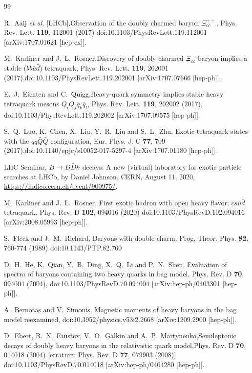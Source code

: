 \documentclass[prt,twocolumn,floatfix,nofootinbib]{revtex4}
\begin{document}
\begin{thebibliography}{99}

    R.~Aaij \textit{et al.} [LHCb],Observation of the doubly charmed baryon $\Xi_{cc}^{++}$, Phys. Rev. Lett. \textbf{119}, 112001 (2017)
    doi:10.1103/PhysRevLett.119.112001 [arXiv:1707.01621 [hep-ex]].

    M.~Karliner and J.~L.~Rosner,Discovery of doubly-charmed $\Xi_{cc}$ baryon implies a stable ($b b \bar{u} \bar{d}$) tetraquark, Phys. Rev. Lett. \textbf{119}, 202001 (2017),doi:10.1103/PhysRevLett.119.202001
    [arXiv:1707.07666 [hep-ph]].

    E.~J.~Eichten and C.~Quigg,Heavy-quark symmetry implies stable heavy tetraquark mesons $Q_iQ_j \bar q_k \bar q_l$, Phys. Rev. Lett. \textbf{119}, 202002 (2017), doi:10.1103/PhysRevLett.119.202002 [arXiv:1707.09575 [hep-ph]].

    S.~Q.~Luo, K.~Chen, X.~Liu, Y.~R.~Liu and S.~L.~Zhu, Exotic tetraquark states with the $qq\bar{Q}\bar{Q}$ configuration, Eur. Phys. J. C \textbf{77}, 709 (2017),doi:10.1140/epjc/s10052-017-5297-4 [arXiv:1707.01180 [hep-ph]].

 LHC Seminar,
    $B\to D\bar{D}h$ decays: A new (virtual) laboratory for exotic particle searches at LHCb, by Daniel Johnson, CERN, August 11, 2020,
    \href{https://indico.cern.ch/event/900975/}{https://indico.cern.ch/event/900975/}.

    M.~Karliner and J.~L.~Rosner, First exotic hadron with open heavy flavor: $cs\bar u\bar d$ tetraquark, Phys. Rev. D \textbf{102}, 094016 (2020)
    doi:10.1103/PhysRevD.102.094016 [arXiv:2008.05993 [hep-ph]].

    S.~Fleck and J.~M.~Richard, Baryons with double charm, Prog. Theor. Phys. \textbf{82}, 760-774 (1989)  doi:10.1143/PTP.82.760

    D.~H.~He, K.~Qian, Y.~B.~Ding, X.~Q.~Li and P.~N.~Shen, Evaluation of spectra of baryons containing two heavy quarks in bag model, Phys. Rev. D \textbf{70}, 094004 (2004), doi:10.1103/PhysRevD.70.094004 [arXiv:hep-ph/0403301 [hep-ph]].

    A.~Bernotas and V.~Simonis, Magnetic moments of heavy baryons in the bag model reexamined, doi:10.3952/physics.v53i2.2668 [arXiv:1209.2900 [hep-ph]].

    D.~Ebert, R.~N.~Faustov, V.~O.~Galkin and A.~P.~Martynenko,Semileptonic decays of doubly heavy baryons in the relativistic quark model,Phys. Rev. D \textbf{70}, 014018 (2004) [erratum: Phys. Rev. D \textbf{77}, 079903 (2008)]
    doi:10.1103/PhysRevD.70.014018  [arXiv:hep-ph/0404280 [hep-ph]].


\end{thebibliography}
\end{document}
